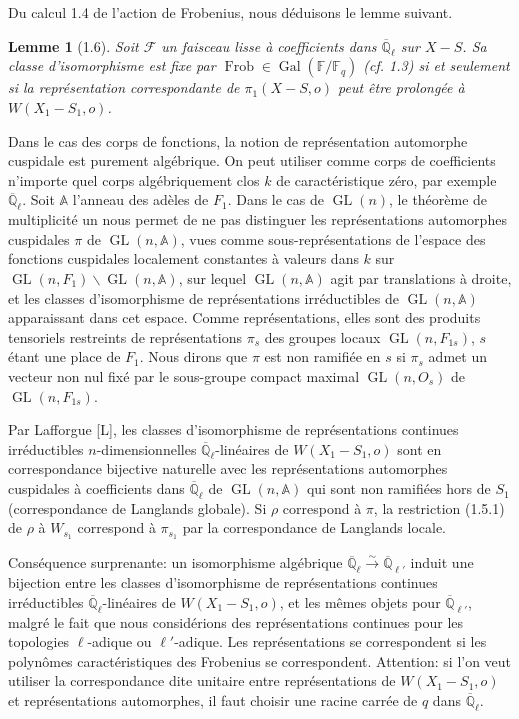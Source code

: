 \documentclass[10pt]{article}
\newcommand{\Fq}{\mathbb F_q}
\newcommand{\Fb}{\mathbb F}
\newcommand{\Ql}{\overline{\mathbb Q}_{\ell}}
\newcommand{\Adele}{\mathbb A}
\newcommand{\GL}{\operatorname{GL}}
\newcommand{\Gal}{\operatorname{Gal}}
\newcommand{\Frob}{\operatorname{Frob}}
\theoremstyle{deligne}
\newtheorem*{lemma*}{Lemme}
\newcommand{\heading}[1]{\vspace{0.7em}\noindent{\bfseries #1}\quad}
\begin{document}
Du calcul 1.4 de l'action de Frobenius, nous déduisons le lemme suivant.

\begin{lemma*}[1.6]
Soit $\mathcal F$ un faisceau lisse à coefficients dans $\Ql$ sur $X-S$. Sa classe d'isomorphisme est fixe par $\Frob\in\Gal(\Fb/\Fq)$ (cf. 1.3) si et seulement si la représentation correspondante de $\pi_1(X-S,o)$ peut être prolongée à $W(X_1-S_1,o)$.
\end{lemma*}

\heading{1.7.} Dans le cas des corps de fonctions, la notion de représentation automorphe cuspidale est purement algébrique. On peut utiliser comme corps de coefficients n'importe quel corps algébriquement clos $k$ de caractéristique zéro, par exemple $\Ql$. Soit $\Adele$ l'anneau des adèles de $F_1$. Dans le cas de $\GL(n)$, le théorème de multiplicité un nous permet de ne pas distinguer les représentations automorphes cuspidales $\pi$ de $\GL(n,\Adele)$, vues comme sous-représentations de l'espace des fonctions cuspidales localement constantes à valeurs dans $k$ sur $\GL(n,F_1)\backslash\GL(n,\Adele)$, sur lequel $\GL(n,\Adele)$ agit par translations à droite, et les classes d'isomorphisme de représentations irréductibles de $\GL(n,\Adele)$ apparaissant dans cet espace. Comme représentations, elles sont des produits tensoriels restreints de représentations $\pi_s$ des groupes locaux $\GL(n,F_{1s})$, $s$ étant une place de $F_1$. Nous dirons que $\pi$ est non ramifiée en $s$ si $\pi_s$ admet un vecteur non nul fixé par le sous-groupe compact maximal $\GL(n,O_s)$ de $\GL(n,F_{1s})$.

Par Lafforgue [L], les classes d'isomorphisme de représentations continues irréductibles $n$-dimensionnelles $\Ql$-linéaires de $W(X_1-S_1,o)$ sont en correspondance bijective naturelle avec les représentations automorphes cuspidales à coefficients dans $\Ql$ de $\GL(n,\Adele)$ qui sont non ramifiées hors de $S_1$ (correspondance de Langlands globale). Si $\rho$ correspond à $\pi$, la restriction (1.5.1) de $\rho$ à $W_{s_1}$ correspond à $\pi_{s_1}$ par la correspondance de Langlands locale.

Conséquence surprenante: un isomorphisme algébrique $\Ql\overset{\sim}{\to}\overline{\mathbb Q}_{\ell'}$ induit une bijection entre les classes d'isomorphisme de représentations continues irréductibles $\Ql$-linéaires de $W(X_1-S_1,o)$, et les mêmes objets pour $\overline{\mathbb Q}_{\ell'}$, malgré le fait que nous considérions des représentations continues pour les topologies $\ell$-adique ou $\ell'$-adique. Les représentations se correspondent si les polynômes caractéristiques des Frobenius se correspondent. Attention: si l'on veut utiliser la correspondance dite unitaire entre représentations de $W(X_1-S_1,o)$ et représentations automorphes, il faut choisir une racine carrée de $q$ dans $\Ql$.
\end{document}
